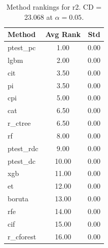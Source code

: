 \begin{table}[h]
\centering
\caption{Method rankings for r2. CD = 23.068 at $\alpha=0.05$.}
\label{tab:ranks_r2}
\begin{tabular}{lcc}
\toprule
Method & Avg Rank & Std \\
\midrule
ptest_pc & 1.00 & 0.00 \\
lgbm & 2.00 & 0.00 \\
cit & 3.50 & 0.00 \\
pi & 3.50 & 0.00 \\
cpi & 5.00 & 0.00 \\
cat & 6.50 & 0.00 \\
r_ctree & 6.50 & 0.00 \\
rf & 8.00 & 0.00 \\
ptest_rdc & 9.00 & 0.00 \\
ptest_dc & 10.00 & 0.00 \\
xgb & 11.00 & 0.00 \\
et & 12.00 & 0.00 \\
boruta & 13.00 & 0.00 \\
rfe & 14.00 & 0.00 \\
cif & 15.00 & 0.00 \\
r_cforest & 16.00 & 0.00 \\
\bottomrule
\end{tabular}
\end{table}